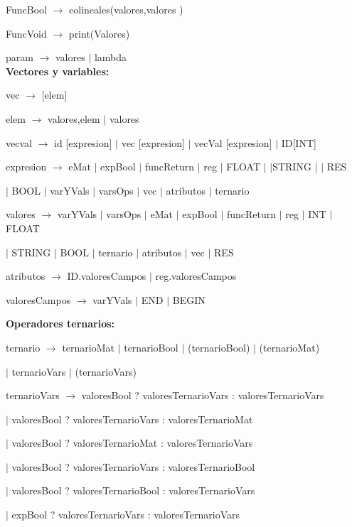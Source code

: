 \documentclass[10pt, a4paper]{article}
\begin{document}
FuncBool $\rightarrow$ colineales(valores,valores )

FuncVoid $\rightarrow$ print(Valores) 

param $\rightarrow$ valores $|$ lambda \\

\textbf{Vectores y variables:}

vec $\rightarrow$ [elem]

elem $\rightarrow$ valores,elem $|$ valores

vecval $\rightarrow$ id [expresion] $|$ vec [expresion] $|$ vecVal [expresion] $|$ ID[INT]

expresion $\rightarrow$ eMat
$|$  expBool
$|$  funcReturn
$|$  reg
$|$  FLOAT $|$
$|$STRING $|$
$|$  RES

\hspace{15mm}$|$   BOOL $|$  varYVals $|$  varsOps $|$  vec $|$  atributos $|$  ternario 
 
valores $\rightarrow$  varYVals
$|$  varsOps
$|$  eMat
$|$  expBool
$|$  funcReturn
$|$  reg
$|$  INT
$|$  FLOAT
  
  \hspace{15mm}$|$  STRING
  $|$  BOOL
  $|$  ternario
  $|$  atributos
  $|$  vec
  $|$  RES
 
atributos $\rightarrow$ ID.valoresCampos $|$ reg.valoresCampos

valoresCampos $\rightarrow$ varYVals $|$ END $|$ BEGIN

\textbf{Operadores ternarios:}

ternario $\rightarrow$ ternarioMat $|$ ternarioBool $|$ (ternarioBool) $|$ (ternarioMat) 

\hspace{15mm}$|$ ternarioVars  $|$ (ternarioVars)

ternarioVars $\rightarrow$ valoresBool ? valoresTernarioVars : valoresTernarioVars  

  \hspace{15mm}$|$  valoresBool ? valoresTernarioVars : valoresTernarioMat 
  
  \hspace{15mm}$|$  valoresBool ? valoresTernarioMat : valoresTernarioVars
  
  \hspace{15mm}$|$  valoresBool ? valoresTernarioVars : valoresTernarioBool 
  
  \hspace{15mm}$|$  valoresBool ? valoresTernarioBool : valoresTernarioVars
  
  \hspace{15mm}$|$  expBool ? valoresTernarioVars : valoresTernarioVars
  
\end{document}
